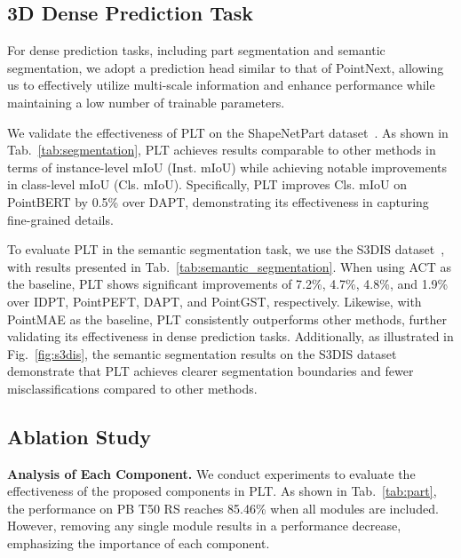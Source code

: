 









\subsection{3D Dense Prediction Task}
For dense prediction tasks, including part segmentation and semantic segmentation, we adopt a prediction head similar to that of PointNext, allowing us to effectively utilize multi-scale information and enhance performance while maintaining a low number of trainable parameters.

We validate the effectiveness of PLT on the ShapeNetPart dataset~\cite{yi2016scalable}. As shown in Tab.~\ref{tab:segmentation}, PLT achieves results comparable to other methods in terms of instance-level mIoU (Inst. mIoU) while achieving notable improvements in class-level mIoU (Cls. mIoU). Specifically, PLT improves Cls. mIoU on PointBERT by 0.5\% over DAPT, demonstrating its effectiveness in capturing fine-grained details.

To evaluate PLT in the semantic segmentation task, we use the S3DIS dataset~\cite{armeni20163d}, with results presented in Tab.~\ref{tab:semantic_segmentation}. When using ACT as the baseline, PLT shows significant improvements of 7.2\%, 4.7\%, 4.8\%, and 1.9\% over IDPT, PointPEFT, DAPT, and PointGST, respectively. Likewise, with PointMAE as the baseline, PLT consistently outperforms other methods, further validating its effectiveness in dense prediction tasks. Additionally, as illustrated in Fig.~\ref{fig:s3dis}, the semantic segmentation results on the S3DIS dataset demonstrate that PLT achieves clearer segmentation boundaries and fewer misclassifications compared to other methods.












\subsection{Ablation Study}

\textbf{Analysis of Each Component.} We conduct experiments to evaluate the effectiveness of the proposed components in PLT. As shown in Tab.~\ref{tab:part}, the performance on PB T50 RS reaches 85.46\% when all modules are included. However, removing any single module results in a performance decrease, emphasizing the importance of each component.

